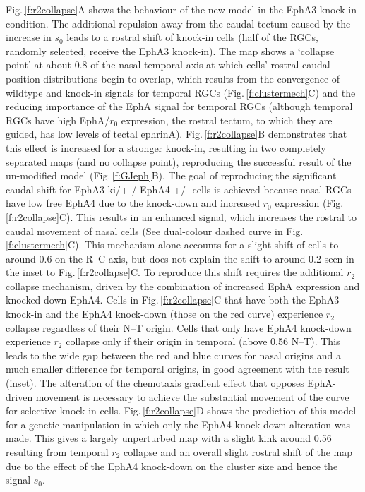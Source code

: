 \documentclass[11pt, a4paper]{article}
\begin{document}
Fig.\,\ref{f:r2collapse}A shows the behaviour of the new model in the EphA3 knock-in condition.
The additional repulsion away from the caudal tectum caused by the increase in $s_0$ leads to a rostral shift of knock-in cells (half of the RGCs, randomly selected, receive the EphA3 knock-in).
The map shows a `collapse point' at about 0.8 of the nasal-temporal axis at which cells' rostral caudal position distributions begin to overlap, which results from the convergence of wildtype and knock-in signals for temporal RGCs (Fig.\,\ref{f:clustermech}C) and the reducing importance of the EphA signal for temporal RGCs (although temporal RGCs have high EphA/$r_0$ expression, the rostral tectum, to which they are guided, has low levels of tectal ephrinA).
Fig.\,\ref{f:r2collapse}B demonstrates that this effect is increased for a stronger knock-in, resulting in two completely separated maps (and no collapse point), reproducing the successful result of the un-modified model (Fig.\,\ref{f:GJeph}B).
The goal of reproducing the significant caudal shift for EphA3 ki/+ / EphA4 +/- cells is achieved because nasal RGCs have low free EphA4 due to the knock-down and increased $r_0$ expression (Fig.\,\ref{f:r2collapse}C). 
This results in an enhanced signal, which increases the rostral to caudal movement of nasal cells (See dual-colour dashed curve in Fig.\,\ref{f:clustermech}C).
This mechanism alone accounts for a slight shift of cells to around 0.6 on the R--C axis, but does not explain the shift to around 0.2 seen in the inset to Fig.\,\ref{f:r2collapse}C.
To reproduce this shift requires the additional $r_2$ collapse mechanism, driven by the combination of increased EphA expression and knocked down EphA4.
Cells in Fig.\,\ref{f:r2collapse}C that have both the EphA3 knock-in and the EphA4 knock-down (those on the red curve) experience $r_2$ collapse regardless of their N--T origin. Cells that only have EphA4 knock-down experience $r_2$ collapse only if their origin in temporal (above 0.56 N--T).
This leads to the wide gap between the red and blue curves for nasal origins and a much smaller difference for temporal origins, in good agreement with the \citet{reber_relative_2004} result (inset).
The alteration of the chemotaxis gradient effect that opposes EphA-driven movement is necessary to achieve the substantial movement of the curve for selective knock-in cells.
Fig.\,\ref{f:r2collapse}D shows the prediction of this model for a genetic manipulation in which only the EphA4 knock-down alteration was made. This gives a largely unperturbed map with a slight kink around 0.56 resulting from temporal $r_2$ collapse and an overall slight rostral shift of the map due to the effect of the EphA4 knock-down on the cluster size and hence the signal $s_0$.
\end{document}
